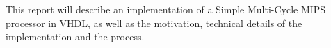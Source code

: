 
This report will describe an implementation of a Simple Multi-Cycle MIPS processor in VHDL, 
as well as the motivation, technical details of the implementation and the process.


